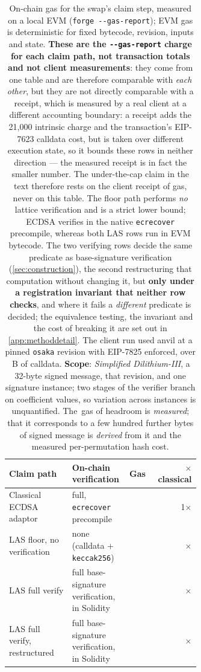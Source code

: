 \begin{table}[!htbp]
  \centering
  \caption[On-chain settlement gas: classical vs.\ post-quantum]{On-chain gas for the
  swap's claim step, measured on a local EVM (\texttt{forge\ -{}-gas-report}); EVM gas is
  deterministic for fixed bytecode, revision, inputs and state. \textbf{These are the
  \texttt{-{}-gas-report} charge for each claim path, not transaction totals and not
  client measurements}: they come from one table and are therefore comparable with
  \emph{each other}, but they are not directly comparable with a receipt, which is
  measured by a real client at a different accounting boundary: a receipt adds the
  21{,}000 intrinsic charge and the transaction's EIP-7623 calldata cost, but is taken
  over different execution state, so it bounds these rows in neither direction --- the
  measured receipt is in fact the smaller number. The
  under-the-cap claim in the text therefore rests on the client receipt of
  \gasOptReceipt{} gas, never on this table.
  The floor path performs \emph{no} lattice verification and is a strict lower bound;
  ECDSA verifies in the native \texttt{ecrecover} precompile, whereas both LAS rows run
  in EVM bytecode. The two verifying rows decide the same predicate as
  base-signature verification (\cref{sec:construction}), the second restructuring that
  computation without changing it, but \textbf{only under a registration invariant
  that neither row checks}, and where it fails a \emph{different} predicate is decided;
  the equivalence testing, the invariant and the cost of breaking it are set out in
  \cref{app:methoddetail}. The client run used anvil at a pinned
  \texttt{osaka} revision with EIP-7825 enforced, over \gasOptCalldata{}\,B of calldata.
  \textbf{Scope}: \emph{Simplified Dilithium-III}, a 32-byte signed message, that
  revision, and one signature instance; two stages of the verifier branch on
  coefficient values, so variation across instances is unquantified. The
  \gasOptHeadroom{}\,gas of headroom is \emph{measured}; that it
  corresponds to a few hundred further bytes of signed message is \emph{derived} from it
  and the measured per-permutation hash cost.}
  \label{tab:onchain}
  \small
  \setlength{\tabcolsep}{5pt}
  \begin{tabular}{@{}L{0.33\linewidth}L{0.30\linewidth}rr@{}}
    \toprule
    Claim path & On-chain verification & Gas & $\times$ classical \\
    \midrule
    Classical ECDSA adaptor
      & full, \texttt{ecrecover} precompile   & \gasClassical{}     & 1$\times$ \\
    LAS floor, no verification
      & none (calldata + \texttt{keccak256})   & \gasLasFloor{}    & \gasRatioFloor{}$\times$ \\
    LAS full verify
      & full base-signature verification, in Solidity & \gasLasVerified{} & \gasRatioVerified{}$\times$ \\
    LAS full verify, restructured
      & full base-signature verification, in Solidity & \gasLasOpt{} & \gasRatioOpt{}$\times$ \\
    \bottomrule
  \end{tabular}
\end{table}

